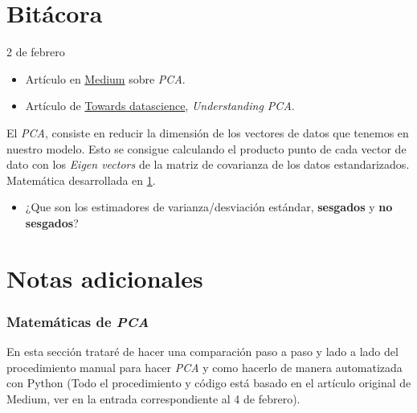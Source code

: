 
\maketitle

\part{Bitácora}
\begin{entry}{2 de febrero}
\tcbsubtitle{\LBlimportant}
\begin{itemize}
    \item Artículo en \href{https://medium.com/codex/principal-component-analysis-pca-how-it-works-mathematically-d5de4c7138e6}{Medium} sobre \textit{PCA}.
    
    \item Artículo de \href{https://towardsdatascience.com/understanding-pca-fae3e243731d}{Towards datascience}, \textit{Understanding PCA}.
\end{itemize}
\tcblower
\tcbsubtitle{\LBlsummary}
El \textit{PCA}, consiste en reducir la dimensión de los vectores de datos que tenemos en nuestro modelo. Esto se consigue calculando el producto punto de cada vector de dato con los \textit{Eigen vectors} de la matriz de covarianza de los datos estandarizados. Matemática desarrollada en \ref{PCAmath}.
\vspace{0.4em}
\tcbsubtitle{\LBltodo}\vspace{-1.25em}
\begin{itemize}
    \item ¿Que son los estimadores de varianza/desviación estándar, \textbf{sesgados} y \textbf{no sesgados}?
\end{itemize}
\end{entry}

\newpage

\part{Notas adicionales}
\section{Matemáticas de \textit{PCA}}\label{PCAmath}
En esta sección trataré de hacer una comparación paso a paso y lado a lado del procedimiento manual para hacer \textit{PCA} y como hacerlo de manera automatizada con Python (Todo el procedimiento y código está basado en el artículo original de Medium, ver en la entrada correspondiente al 4 de febrero).
